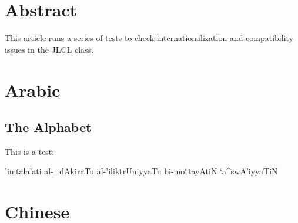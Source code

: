 \documentclass{jlcl}
\title{\articletitle}
\author{AUTHOR NAME\\
AUTHOR INSTITUTION\\
\texttt{AUTHOR EMAIL} \and
AUTHOR 2 NAME\\
AUTHOR 2 INSTITUTION\\
 \texttt{AUTHOR 2 EMAIL}}
\begin{document}
\setarab %
\vocalize %
\transtrue %


\setcounter{page}{1}
\thispagestyle{firstpage}

\authordata




\section*{Abstract}
This article runs a series of tests to check internationalization and compatibility issues in the JLCL class.



\section{Arabic}

\subsection{The Alphabet}


This is a test: 

\begin{RLtext}'imtala'ati al-_dAkiraTu al-'iliktrUniyyaTu bi-mo`.tayAtiN `a^swA'iyyaTiN\end{RLtext}


\section{Chinese}
\end{document}
